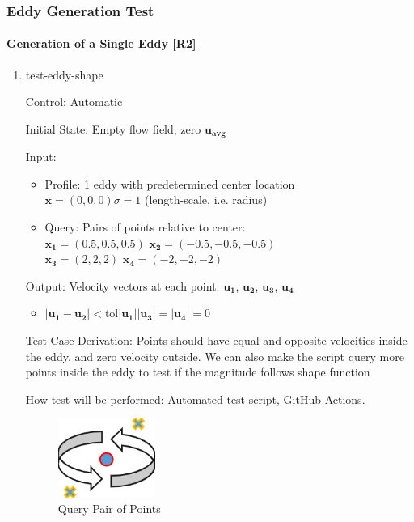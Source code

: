 \documentclass[12pt, titlepage]{article}
\begin{document}
\newpage
\subsubsection{Eddy Generation Test} \label{EddyGenTest}
\paragraph{Generation of a Single Eddy [R2]}

\begin{enumerate}

  \item{test-eddy-shape\\}

  Control: Automatic
            
  Initial State: Empty flow field, zero $\mathbf{u_{avg}}$
            
  Input:
  \begin{itemize}
    \item Profile: 1 eddy with predetermined center location\\
    $\mathbf{x}=(0,0,0)$\tab$\sigma=1$ (length-scale, i.e. radius) 
    \item Query: Pairs of points relative to center:\\
    $\mathbf{x_1}=(0.5,0.5,0.5)$ \tab$\mathbf{x_2}=(-0.5,-0.5,-0.5)$\\
    $\mathbf{x_3}=(2,2,2)$ \tab$\mathbf{x_4}=(-2,-2,-2)$
  \end{itemize}
  Output: Velocity vectors at each point: $\mathbf{u_1}$, $\mathbf{u_2}$, $\mathbf{u_3}$, $\mathbf{u_4}$
  \begin{itemize}
    \item $|\mathbf{u_1} -\mathbf{u_2}| <\text{tol}|\mathbf{u_1}|$\tab $|\mathbf{u_3}| = |\mathbf{u_4}|=0$
  \end{itemize}

  Test Case Derivation: Points should have equal and opposite velocities inside the eddy, and zero velocity outside. We can also make the script query more points inside the eddy to test if the magnitude follows shape function
            
  How test will be performed: Automated test script, GitHub Actions.

  \begin{figure}[h!]
    \begin{center}
    \includegraphics[width=0.3\textwidth]{eddy-shape.png}
    \caption{Query Pair of Points}
    \label{Fig_EddyShape} 
    \end{center}
  \end{figure}


\end{enumerate}
\end{document}
